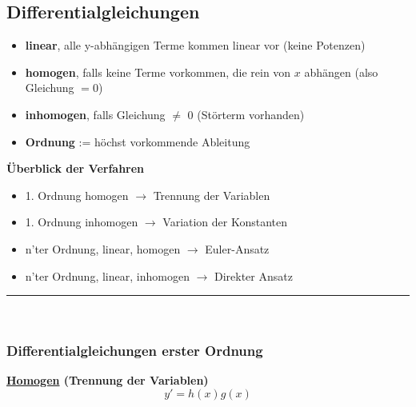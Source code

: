 \documentclass[6pt]{article}
\begin{document}
\begin{multicols*}{3}
			
						


\pagebreak
\subsection*{Differentialgleichungen}

	\begin{itemize}[itemsep=2pt, parsep=3pt]
		\item {\bf linear}, alle y-abh{\"a}ngigen Terme kommen linear vor (keine Potenzen)
		\item {\bf homogen}, falls keine Terme vorkommen, die rein von $x$ abh{\"a}ngen (also Gleichung $= 0$)
		\item {\bf inhomogen}, falls Gleichung $\not =$ 0 (St{\"o}rterm vorhanden)
		\item {\bf Ordnung} := h{\"o}chst vorkommende Ableitung
	\end{itemize}
	\vspace{2mm}
	
	{\bf {\"U}berblick der Verfahren} \\
	\vspace{-2mm}
		\begin{itemize}[itemsep=2pt, parsep=3pt]
			\item 1. Ordnung homogen $\rightarrow$ Trennung der Variablen 
			\item 1. Ordnung inhomogen $\rightarrow$ Variation der Konstanten
			\item n'ter Ordnung, linear, homogen $\rightarrow$ Euler-Ansatz	
			\item n'ter Ordnung, linear, inhomogen $\rightarrow$ Direkter Ansatz	 
		\end{itemize}
	
	

	\vspace{2mm}
  		\noindent\textcolor{gray}{\rule{9cm}{0.2pt}}
	\vspace{-8mm}\\
	
	\subsubsection*{Differentialgleichungen erster Ordnung}
	
	{\bf \underline{Homogen} (Trennung der Variablen)}\\
						\vspace{-2mm}
						\[ y' = h(x)g(x) \]
						

\end{multicols*}
\end{document}
